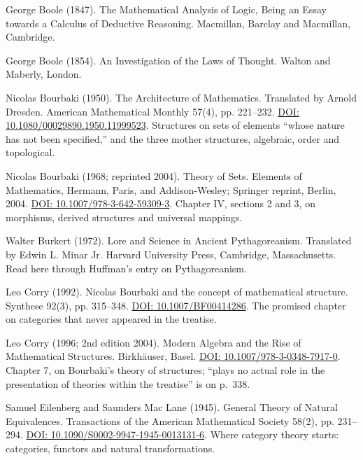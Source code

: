 \noindent George Boole (1847). The Mathematical Analysis of Logic, Being an Essay towards a Calculus of Deductive Reasoning. Macmillan, Barclay and Macmillan, Cambridge.
\par\medskip

\noindent George Boole (1854). An Investigation of the Laws of Thought. Walton and Maberly, London.
\par\medskip

\noindent Nicolas Bourbaki (1950). The Architecture of Mathematics. Translated by Arnold Dresden. American Mathematical Monthly 57(4), pp. 221--232. \href{https://doi.org/10.1080/00029890.1950.11999523}{DOI: 10.1080/00029890.1950.11999523}. Structures on sets of elements ``whose nature has not been specified,'' and the three mother structures, algebraic, order and topological.
\par\medskip

\noindent Nicolas Bourbaki (1968; reprinted 2004). Theory of Sets. Elements of Mathematics, Hermann, Paris, and Addison-Wesley; Springer reprint, Berlin, 2004. \href{https://doi.org/10.1007/978-3-642-59309-3}{DOI: 10.1007/978-3-642-59309-3}. Chapter IV, sections 2 and 3, on morphisms, derived structures and universal mappings.
\par\medskip

\noindent Walter Burkert (1972). Lore and Science in Ancient Pythagoreanism. Translated by Edwin L. Minar Jr. Harvard University Press, Cambridge, Massachusetts. Read here through Huffman's entry on Pythagoreanism.
\par\medskip

\noindent Leo Corry (1992). Nicolas Bourbaki and the concept of mathematical structure. Synthese 92(3), pp. 315--348. \href{https://doi.org/10.1007/BF00414286}{DOI: 10.1007/BF00414286}. The promised chapter on categories that never appeared in the treatise.
\par\medskip

\noindent Leo Corry (1996; 2nd edition 2004). Modern Algebra and the Rise of Mathematical Structures. Birkh\"auser, Basel. \href{https://doi.org/10.1007/978-3-0348-7917-0}{DOI: 10.1007/978-3-0348-7917-0}. Chapter 7, on Bourbaki's theory of structures; ``plays no actual role in the presentation of theories within the treatise'' is on p.~338.
\par\medskip

\noindent Samuel Eilenberg and Saunders Mac Lane (1945). General Theory of Natural Equivalences. Transactions of the American Mathematical Society 58(2), pp. 231--294. \href{https://doi.org/10.1090/S0002-9947-1945-0013131-6}{DOI: 10.1090/S0002-9947-1945-0013131-6}. Where category theory starts: categories, functors and natural transformations.
\par\medskip

